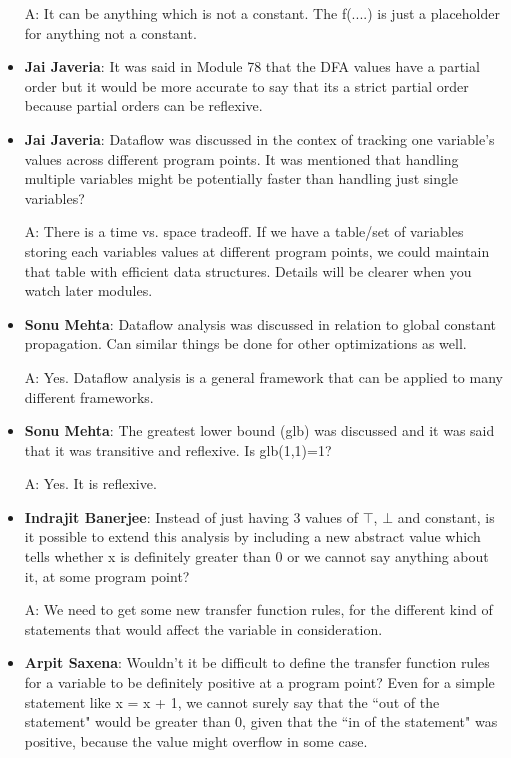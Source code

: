\begin{itemize}
    A: It can be anything which is not a constant. The f(....) is just a placeholder for anything not a constant.
    
    \item \textbf{Jai Javeria}: It was said in Module 78 that the DFA values have a partial order but it would be more accurate to say that its a strict partial order because partial orders can be reflexive.
    
    \item \textbf{Jai Javeria}: Dataflow was discussed in the contex of tracking one variable's values across different program points. It was mentioned that handling multiple variables might be potentially faster than handling just single variables?
    
    A: There is a time vs. space tradeoff. If we have a table/set of variables storing each variables values at different program points, we could maintain that table with efficient data structures. Details will be clearer when you watch later modules.
    
    \item \textbf{Sonu Mehta}: Dataflow analysis was discussed in relation to global constant propagation. Can similar things be done for other optimizations as well.
    
    A: Yes. Dataflow analysis is a general framework that can be applied to many different frameworks.
    
    \item \textbf{Sonu Mehta}: The greatest lower bound (glb) was discussed and it was said that it was transitive and reflexive. Is glb(1,1)=1?
    
    A: Yes. It is reflexive.
    
    \item\textbf{Indrajit Banerjee}: Instead of just having 3 values of $\top$, $\bot$ and constant, is it possible to extend this analysis by including a new abstract value which tells whether x is definitely greater than 0 or we cannot say anything about it, at some program point?
    
    A: We need to get some new transfer function rules, for the different kind of statements that would affect the variable in consideration.
    
    \item \textbf{Arpit Saxena}: Wouldn't it be difficult to define the transfer function rules for a variable to be definitely positive at a program point? Even for a simple statement like x = x + 1, we cannot surely say that the ``out of the statement" would be greater than 0, given that the ``in of the statement" was positive, because the value might overflow in some case.
    

\end{itemize}
